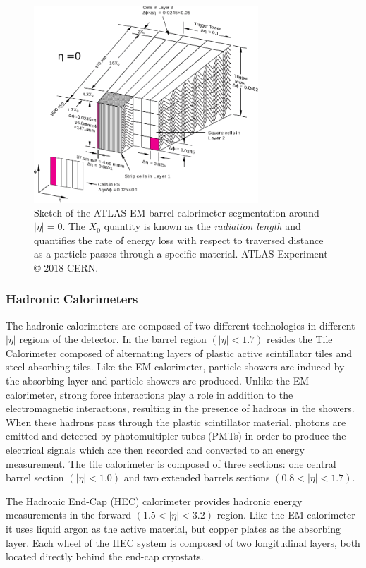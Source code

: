 \begin{figure}
	\centering
	\includegraphics[width=0.75\textwidth]{em_calo_segment}
	\caption{Sketch of the ATLAS EM barrel calorimeter segmentation around $|\eta| = 0$. 
	The $X_0$ quantity is known as the \textit{radiation length} and quantifies the rate of energy loss with respect to traversed distance as a particle passes through a specific material.
	ATLAS Experiment © 2018 CERN.}
	\label{fig:em_calo_segment}
\end{figure}

\subsubsection{Hadronic Calorimeters}
The hadronic calorimeters are composed of two different technologies in different $|\eta|$ regions of the detector.
In the barrel region $(|\eta| < 1.7)$ resides the Tile Calorimeter composed of alternating layers of plastic active scintillator tiles and steel absorbing tiles.
Like the EM calorimeter, particle showers are induced by the absorbing layer and particle showers are produced.
Unlike the EM calorimeter, strong force interactions play a role in addition to the electromagnetic interactions, resulting in the presence of hadrons in the showers.
When these hadrons pass through the plastic scintillator material, photons are emitted and detected by photomultipler tubes (PMTs) in order to produce the electrical signals which are then recorded and converted to an energy measurement.
The tile calorimeter is composed of three sections: one central barrel section $(|\eta| < 1.0)$ and two extended barrels sections $(0.8 < |\eta| < 1.7)$.

The Hadronic End-Cap (HEC) calorimeter provides hadronic energy measurements in the forward $(1.5 < |\eta| < 3.2)$ region.
Like the EM calorimeter it uses liquid argon as the active material, but copper plates as the absorbing layer.
Each wheel of the HEC system is composed of two longitudinal layers, both located directly behind the end-cap cryostats.

